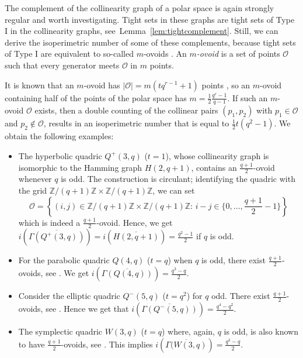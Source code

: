 \documentclass[a4paper,11pt]{article}
\theoremstyle{definition}
\newcommand{\marrow}{\marginpar[\hfill$\longrightarrow$]{$\longleftarrow$}}
\newcommand{\niceremarkcolor}[4]{\textcolor{#4}{\textsc{#1 #2:} \marrow\textsf{#3}}}
\newcommand{\robin}[2][says]{\niceremarkcolor{Robin}{#1}{#2}{Brown}}
\newcommand{\jim}[2][says]{\niceremarkcolor{Jim}{#1}{#2}{Green}}
\begin{document}
The complement of the collinearity graph of a polar space is again strongly regular and worth investigating. Tight sets %
in these graphs are tight sets of Type I in the collinearity graphs, see~Lemma~\ref{lem:tightcomplement}.
Still, we can derive the isoperimetric number of some of these complements, because tight sets of Type I are equivalent to so-called \(m\)-ovoids \cite[Proposition~2.1]{DeBruyn2008}. 
An \emph{\(m\)-ovoid} is a set of points $\mathcal{O}$ such that every generator meets $\mathcal{O}$ in $m$ points.


It is known that an $m$-ovoid has $|\mathcal{O|} = m(tq^{r-1}+1)$ points \cite{StronglyBrouwer}, so an $m$-ovoid containing half of the points of the polar space has $m = \frac12\frac{q^r-1}{q-1}$. If such an $m$-ovoid \(\mathcal{O}\) exists, then a double counting of the collinear pairs \((p_1,p_2)\) with \(p_1\in\mathcal{O}\) and \(p_2\notin\mathcal{O}\), results in an isoperimetric number that is equal to \(\frac12t(q^2-1)\). 
We obtain the following examples:
\begin{itemize}
    \item  The hyperbolic quadric $Q^+(3,q)$ ($t=1$), whose collinearity graph is isomorphic to the Hamming graph $H(2,q+1)$, contains an $\frac{q+1}{2}$-ovoid whenever $q$ is odd. The construction is circulant; identifying the quadric with the grid \(\mathbb{Z}/(q+1)\mathbb{Z}\times\mathbb{Z}/(q+1)\mathbb{Z}\), we can set $$\mathcal{O} = \left\{(i,j)\in\mathbb{Z}/(q+1)\mathbb{Z}\times\mathbb{Z}/(q+1)\mathbb{Z}\colon\, i-j \in \{0,\dots,\frac{q+1}{2}-1\}\right\}$$
    which is indeed a $\frac{q+1}{2}$-ovoid. 
    Hence, we get $i(\overline{\Gamma(Q^+(3,q))})=i(\overline{H(2,q+1)}) = \frac{q^2-1}{2}$ if \(q\) is odd.
    \item For the parabolic quadric $Q(4,q)$ ($t=q$) when $q$ is odd, there exist $\frac{q+1}{2}$-ovoids, see \cite[Section 3]{Bamberg2009}. We get $i(\overline{\Gamma(Q(4,q))})=\frac{q^3-q}{2}$.
    \item Consider the elliptic quadric $Q^-(5,q)$ ($t=q^2$) for $q$ odd. There exist $\frac{q+1}{2}$-ovoids, see \cite{Coss2005}. Hence we get that $i(\overline{\Gamma(Q^-(5,q))}) = \frac{q^4-q^2}{2}$.
    \item The symplectic quadric $W(3,q)$ ($t=q$) where, again, $q$ is odd, is also known to have $\frac{q+1}{2}$-ovoids, see \cite{Coss2008}. This implies $i(\overline{\Gamma(W(3,q)}) = \frac{q^3-q}{2}$. 
\end{itemize}
\end{document}
